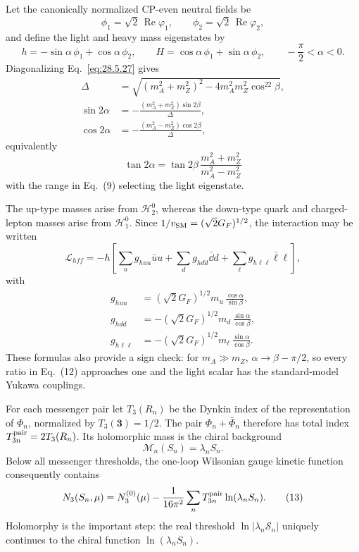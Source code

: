 \begin{enumerate}
  Let the canonically normalized CP-even neutral fields be
  \[
    \phi_1=\sqrt2\,\operatorname{Re}\varphi_1,\qquad
    \phi_2=\sqrt2\,\operatorname{Re}\varphi_2,
  \]
  and define the light and heavy mass eigenstates by
  \[
    h=-\sin\alpha\,\phi_1+\cos\alpha\,\phi_2,\qquad
    H=\cos\alpha\,\phi_1+\sin\alpha\,\phi_2,
    \qquad -\frac{\pi}{2}<\alpha<0.
    \tag{9}
  \]
  Diagonalizing Eq.~\eqref{eq:28.5.27} gives
  \[
  \begin{aligned}
    \Delta&=\sqrt{(m_A^2+m_Z^2)^2
      -4m_A^2m_Z^2\cos^22\beta},\\
    \sin2\alpha&=-\frac{(m_A^2+m_Z^2)\sin2\beta}{\Delta},\\
    \cos2\alpha&=-\frac{(m_A^2-m_Z^2)\cos2\beta}{\Delta},
  \end{aligned}
    \tag{10}
  \]
  equivalently
  \[
    \tan2\alpha=\tan2\beta\,
      \frac{m_A^2+m_Z^2}{m_A^2-m_Z^2}
  \]
  with the range in Eq.~(9) selecting the light eigenstate.

  The up-type masses arise from \(\mathcal H_2^0\), whereas the
  down-type quark and charged-lepton masses arise from
  \(\mathcal H_1^0\).  Since
  \(1/v_{\rm SM}=(\sqrt2G_F)^{1/2}\), the interaction may be written
  \[
    \mathcal L_{hff}
      =-h\left[
        \sum_{u}g_{huu}\bar uu
        +\sum_{d}g_{hdd}\bar \dd d
        +\sum_{\ell}g_{h\ell\ell}\bar\ell\ell
      \right],
    \tag{11}
  \]
  with
  \[
  \begin{aligned}
    g_{huu}
      &=(\sqrt2G_F)^{1/2}m_u\,\frac{\cos\alpha}{\sin\beta},\\
    g_{hdd}
      &=-(\sqrt2G_F)^{1/2}m_d\,\frac{\sin\alpha}{\cos\beta},\\
    g_{h\ell\ell}
      &=-(\sqrt2G_F)^{1/2}m_\ell\,\frac{\sin\alpha}{\cos\beta}.
  \end{aligned}
    \tag{12}
  \]
  These formulas also provide a sign check: for
  \(m_A\gg m_Z\), \(\alpha\to\beta-\pi/2\), so every ratio in
  Eq.~(12) approaches one and the light scalar has the standard-model
  Yukawa couplings.

  For each messenger pair let \(T_3(R_n)\) be the Dynkin index of the
  representation of \(\Phi_n\), normalized by
  \(T_3(\boldsymbol 3)=1/2\).  The pair
  \(\Phi_n+\bar\Phi_n\) therefore has total index
  \(T_{3n}^{\rm pair}=2T_3(R_n)\).  Its holomorphic mass is the chiral
  background
  \[
    \mathcal M_n(S_n)=\lambda_nS_n.
  \]
  Below all messenger thresholds, the one-loop Wilsonian gauge kinetic
  function consequently contains
  \[
    N_3(S_n,\mu)
      =N_3^{(0)}(\mu)
       -\frac1{16\pi^2}
        \sum_nT_{3n}^{\rm pair}\ln(\lambda_nS_n).
    \tag{13}
  \]
  Holomorphy is the important step: the real threshold
  \(\ln|\lambda_n\mathcal S_n|\) uniquely continues to the chiral
  function \(\ln(\lambda_nS_n)\).


\end{enumerate}
